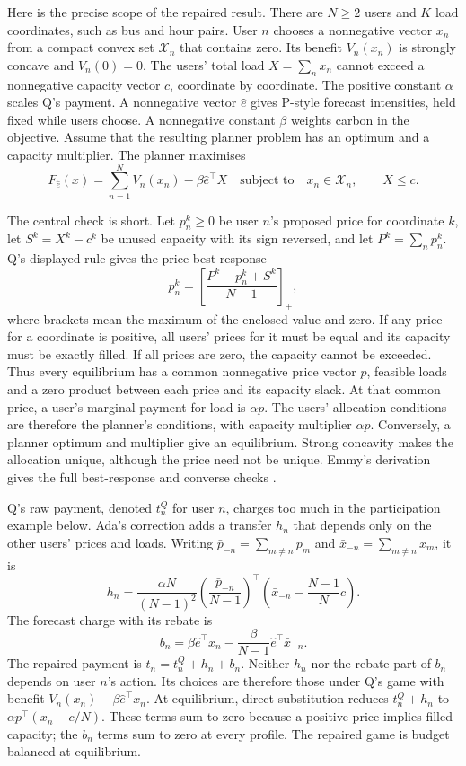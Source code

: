 \documentclass{article}
\begin{document}
Here is the precise scope of the repaired result. There are \(N\geq2\) users and \(K\) load coordinates,
such as bus and hour pairs. User \(n\) chooses a nonnegative vector \(x_n\) from a compact convex set
\(\mathcal X_n\) that contains zero. Its benefit \(V_n(x_n)\) is strongly concave and \(V_n(0)=0\). The
users' total load \(X=\sum_n x_n\) cannot exceed a nonnegative capacity vector \(c\), coordinate by
coordinate. The positive constant \(\alpha\) scales Q's payment. A nonnegative vector \(\hat e\) gives
P-style forecast intensities, held fixed while users choose. A nonnegative constant \(\beta\) weights
carbon in the objective. Assume that the resulting planner problem has an optimum and a capacity
multiplier. The planner maximises
\[
F_{\hat e}(x)=\sum_{n=1}^{N}V_n(x_n)-\beta\hat e^{\top}X
\quad\text{subject to}\quad x_n\in\mathcal X_n,\qquad X\leq c.
\]

The central check is short. Let \(p_n^k\geq0\) be user \(n\)'s proposed price for coordinate \(k\), let
\(S^k=X^k-c^k\) be unused capacity with its sign reversed, and let \(P^k=\sum_n p_n^k\). Q's displayed
rule gives the price best response
\[
p_n^k=\left[\frac{P^k-p_n^k+S^k}{N-1}\right]_+,
\]
where brackets mean the maximum of the enclosed value and zero. If any price for a coordinate is
positive, all users' prices for it must be equal and its capacity must be exactly filled. If all prices
are zero, the capacity cannot be exceeded. Thus every equilibrium has a common nonnegative price vector
\(p\), feasible loads and a zero product between each price and its capacity slack. At that common price,
a user's marginal payment for load is \(\alpha p\). The users' allocation conditions are therefore the
planner's conditions, with capacity multiplier \(\alpha p\). Conversely, a planner optimum and multiplier
give an equilibrium. Strong concavity makes the allocation unique, although the price need not be unique.
Emmy's derivation gives the full best-response and converse checks \cite{Q}.

Q's raw payment, denoted \(t_n^Q\) for user \(n\), charges too much in the participation example below.
Ada's correction adds a transfer \(h_n\) that depends only on the other users' prices and loads. Writing
\(\bar p_{-n}=\sum_{m\ne n}p_m\) and \(\bar x_{-n}=\sum_{m\ne n}x_m\), it is
\[
h_n=\frac{\alpha N}{(N-1)^2}
\left(\frac{\bar p_{-n}}{N-1}\right)^{\top}
\left(\bar x_{-n}-\frac{N-1}{N}c\right).
\]
The forecast charge with its rebate is
\[
b_n=\beta\hat e^{\top}x_n-
\frac{\beta}{N-1}\hat e^{\top}\bar x_{-n}.
\]
The repaired payment is \(t_n=t_n^Q+h_n+b_n\). Neither \(h_n\) nor the rebate part of \(b_n\) depends on
user \(n\)'s action. Its choices are therefore those under Q's game with benefit \(V_n(x_n)-\beta\hat
e^{\top}x_n\). At equilibrium, direct substitution reduces \(t_n^Q+h_n\) to \(\alpha p^{\top}(x_n-c/N)\).
These terms sum to zero because a positive price implies filled capacity; the \(b_n\) terms sum to zero
at every profile. The repaired game is budget balanced at equilibrium.
\end{document}

